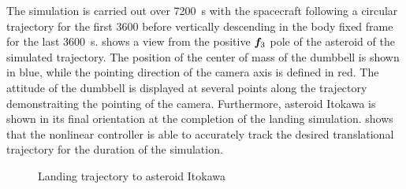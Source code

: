 The simulation is carried out over \SI{7200}{\second} with the spacecraft following a circular trajectory for the first \SI{3600}{\sec} before vertically descending in the body fixed frame for the last \SI{3600}{\second}.
 shows a view from the positive \( \bm{f}_3 \) pole of the asteroid of the simulated trajectory. 
The position of the center of mass of the dumbbell is shown in blue, while the pointing direction of the camera axis is defined in red. 
The attitude of the dumbbell is displayed at several points along the trajectory demonstraiting the pointing of the camera. 
Furthermore, asteroid Itokawa is shown in its final orientation at the completion of the landing simulation. 
 shows that the nonlinear controller is able to accurately track the desired translational trajectory for the duration of the simulation.
\begin{figure}[htbp]
    \captionsetup[subfigure]{position=b}
    \centering
    \caption{Landing trajectory to asteroid Itokawa~\label{fig:position}}
\end{figure}
